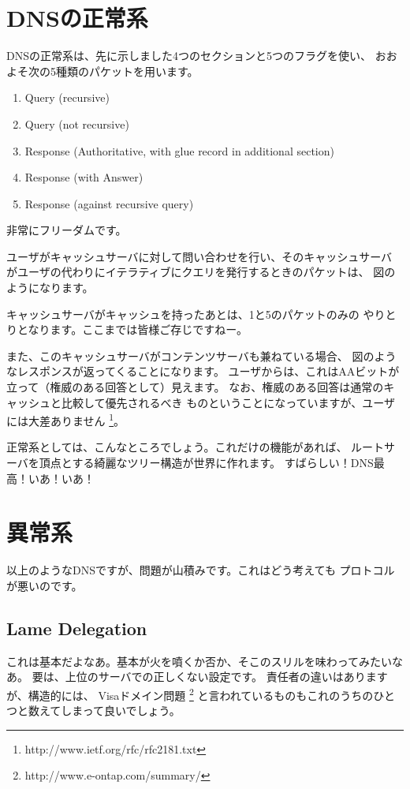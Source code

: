 \section {DNSの正常系}

DNSの正常系は、先に示しました4つのセクションと5つのフラグを使い、
おおよそ次の5種類のパケットを用います。
\begin{enumerate}
  \item Query (recursive)
  \item Query (not recursive)
  \item Response (Authoritative, with glue record in additional section)
  \item Response (with Answer)
  \item Response (against recursive query)
\end{enumerate}
非常にフリーダムです。

ユーザがキャッシュサーバに対して問い合わせを行い、そのキャッシュサーバ
がユーザの代わりにイテラティブにクエリを発行するときのパケットは、
図のようになります。

キャッシュサーバがキャッシュを持ったあとは、1と5のパケットのみの
やりとりとなります。ここまでは皆様ご存じですねー。

また、このキャッシュサーバがコンテンツサーバも兼ねている場合、
図のようなレスポンスが返ってくることになります。
ユーザからは、これはAAビットが立って（権威のある回答として）見えます。
なお、権威のある回答は通常のキャッシュと比較して優先されるべき
ものということになっていますが、ユーザには大差ありません
\footnote{http://www.ietf.org/rfc/rfc2181.txt}。


正常系としては、こんなところでしょう。これだけの機能があれば、
ルートサーバを頂点とする綺麗なツリー構造が世界に作れます。
すばらしい！DNS最高！いあ！いあ！


\section { 異常系 }
以上のようなDNSですが、問題が山積みです。これはどう考えても
プロトコルが悪いのです。

\subsection{ Lame Delegation }
これは基本だよなあ。基本が火を噴くか否か、そこのスリルを味わってみたいなあ。
要は、上位のサーバでの正しくない設定です。
責任者の違いはありますが、構造的には、 Visaドメイン問題 
\footnote{http://www.e-ontap.com/summary/}
と言われているものもこれのうちのひとつと数えてしまって良いでしょう。


